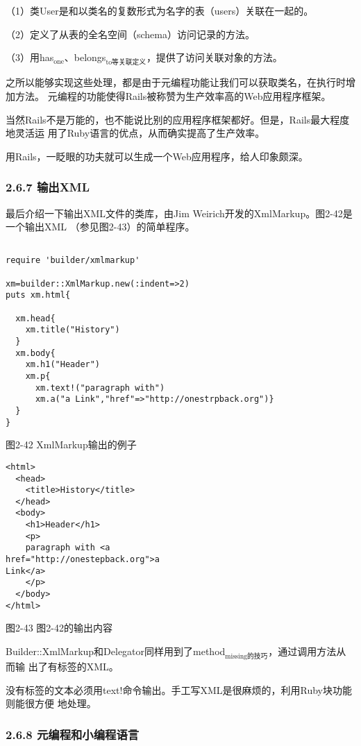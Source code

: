 \documentclass[11pt]{ctexart}
\begin{document}
（1）类User是和以类名的复数形式为名字的表（users）关联在一起的。

（2）定义了从表的全名空间（schema）访问记录的方法。

（3）用has\(_{\text{one}}\)、belongs\(_{\text{to等关联定义}}\)，提供了访问关联对象的方法。

之所以能够实现这些处理，都是由于元编程功能让我们可以获取类名，在执行时增加方法。
元编程的功能使得Rails被称赞为生产效率高的Web应用程序框架。

当然Rails不是万能的，也不能说比别的应用程序框架都好。但是，Rails最大程度地灵活运
用了Ruby语言的优点，从而确实提高了生产效率。

用Rails，一眨眼的功夫就可以生成一个Web应用程序，给人印象颇深。
\subsubsection{2.6.7 输出XML}
\label{sec:orgf713ce8}

最后介绍一下输出XML文件的类库，由Jim Weirich开发的XmlMarkup。图2-42是一个输出XML
（参见图2-43）的简单程序。

\lstset{language=org,label= ,caption= ,captionpos=b,numbers=none}
\begin{lstlisting}

require 'builder/xmlmarkup'

xm=builder::XmlMarkup.new(:indent=>2)
puts xm.html{

  xm.head{
    xm.title("History")
  }
  xm.body{
    xm.h1("Header")
    xm.p{
      xm.text!("paragraph with")
      xm.a("a Link","href"=>"http://onestrpback.org")}
  }
}

\end{lstlisting}

图2-42 XmlMarkup输出的例子

\lstset{language=org,label= ,caption= ,captionpos=b,numbers=none}
\begin{lstlisting}
<html>
  <head>
    <title>History</title>
  </head>
  <body>
    <h1>Header</h1>
    <p>
    paragraph with <a
href="http://onestepback.org">a
Link</a>
    </p>
  </body>
</html>
\end{lstlisting}

图2-43 图2-42的输出内容

Builder::XmlMarkup和Delegator同样用到了method\(_{\text{missing的技巧}}\)，通过调用方法从而输
出了有标签的XML。

没有标签的文本必须用text!命令输出。手工写XML是很麻烦的，利用Ruby块功能则能很方便
地处理。
\subsubsection{2.6.8 元编程和小编程语言}
\label{sec:org41d4bc1}
\end{document}
